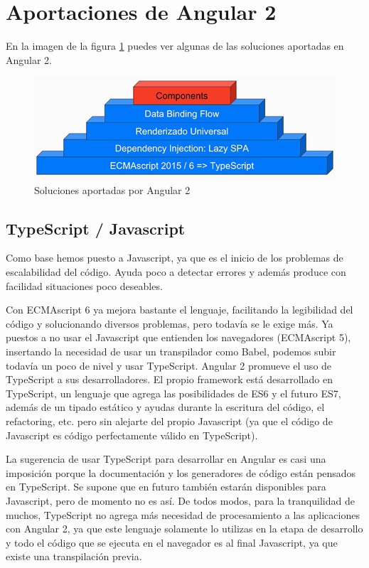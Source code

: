 \documentclass[12pt,twoside]{book}
\begin{document}
\section{Aportaciones de Angular 2}


En la imagen de la  figura \ref{fig100}  puedes ver algunas de las soluciones aportadas en Angular 2.

\begin{figure}
	\centering
	\includegraphics[width=0.9\linewidth]{angular2.jpg}
	\caption{Soluciones aportadas por Angular 2}
	\label{fig100}
\end{figure}


\subsection{TypeScript / Javascript} 
Como base hemos puesto a Javascript, ya que es el inicio de los problemas de escalabilidad del código. Ayuda poco a detectar errores y además produce con facilidad situaciones poco deseables.

Con ECMAscript 6 ya mejora bastante el lenguaje, facilitando la legibilidad del código y solucionando diversos problemas, pero todavía se le exige más. Ya puestos a no usar el Javascript que entienden los navegadores (ECMAscript 5), insertando la necesidad de usar un transpilador como Babel, podemos subir todavía un poco de nivel y usar TypeScript.
Angular 2 promueve el uso de TypeScript a sus desarrolladores. El propio framework está desarrollado en TypeScript, un lenguaje que agrega las posibilidades de ES6 y el futuro ES7, además de un tipado estático y ayudas durante la escritura del código, el refactoring, etc. pero sin alejarte del propio Javascript (ya que el código de Javascript es código perfectamente válido en TypeScript).

La sugerencia de usar TypeScript para desarrollar en Angular es casi una imposición porque la documentación y los generadores de código están pensados en TypeScript. Se supone que en futuro también estarán disponibles para Javascript, pero de momento no es así. De todos modos, para la tranquilidad de muchos, TypeScript no agrega más necesidad de procesamiento a las aplicaciones con Angular 2, ya que este lenguaje solamente lo utilizas en la etapa de desarrollo y todo el código que se ejecuta en el navegador es al final Javascript, ya que existe una transpilación previa.
 
\end{document}
